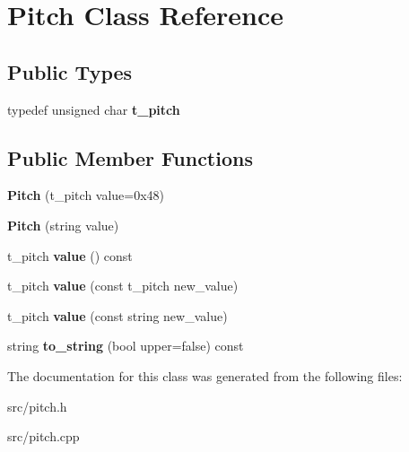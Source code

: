 \hypertarget{class_pitch}{}\section{Pitch Class Reference}
\label{class_pitch}
\subsection*{Public Types}
\begin{DoxyCompactItemize}
\item 
typedef unsigned char {\bfseries t\+\_\+pitch}\hypertarget{class_pitch_a459d4525870a59a7d84b3cbb75a40e4d}{}\label{class_pitch_a459d4525870a59a7d84b3cbb75a40e4d}

\end{DoxyCompactItemize}
\subsection*{Public Member Functions}
\begin{DoxyCompactItemize}
\item 
{\bfseries Pitch} (t\+\_\+pitch value=0x48)\hypertarget{class_pitch_aaf50f25fb7c82433038e6898f8b9cf71}{}\label{class_pitch_aaf50f25fb7c82433038e6898f8b9cf71}

\item 
{\bfseries Pitch} (string value)\hypertarget{class_pitch_a4311cf6a9e65ab893eb204081757ac10}{}\label{class_pitch_a4311cf6a9e65ab893eb204081757ac10}

\item 
t\+\_\+pitch {\bfseries value} () const \hypertarget{class_pitch_ae9397c708e924a19ee2ec4228c27b79e}{}\label{class_pitch_ae9397c708e924a19ee2ec4228c27b79e}

\item 
t\+\_\+pitch {\bfseries value} (const t\+\_\+pitch new\+\_\+value)\hypertarget{class_pitch_a43fe90396dd8b220f7d9a981934f6113}{}\label{class_pitch_a43fe90396dd8b220f7d9a981934f6113}

\item 
t\+\_\+pitch {\bfseries value} (const string new\+\_\+value)\hypertarget{class_pitch_ab5009db2e82790eaf8f85838fca4f12d}{}\label{class_pitch_ab5009db2e82790eaf8f85838fca4f12d}

\item 
string {\bfseries to\+\_\+string} (bool upper=false) const \hypertarget{class_pitch_a695d54c39f32283b82520845fdc7e14d}{}\label{class_pitch_a695d54c39f32283b82520845fdc7e14d}

\end{DoxyCompactItemize}


The documentation for this class was generated from the following files\+:\begin{DoxyCompactItemize}
\item 
src/pitch.\+h\item 
src/pitch.\+cpp\end{DoxyCompactItemize}
